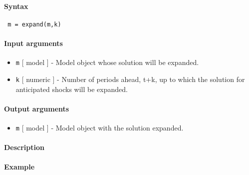 


	\paragraph{Syntax}
 
 \begin{verbatim}
 m = expand(m,k)
 \end{verbatim}
 
 \paragraph{Input arguments}
 
 \begin{itemize}
 \item
   \texttt{m} {[} model {]} - Model object whose solution will be
   expanded.
 \item
   \texttt{k} {[} numeric {]} - Number of periods ahead, t+k, up to which
   the solution for anticipated shocks will be expanded.
 \end{itemize}
 
 \paragraph{Output arguments}
 
 \begin{itemize}
 \item
   \texttt{m} {[} model {]} - Model object with the solution expanded.
 \end{itemize}
 
 \paragraph{Description}
 
 \paragraph{Example}


